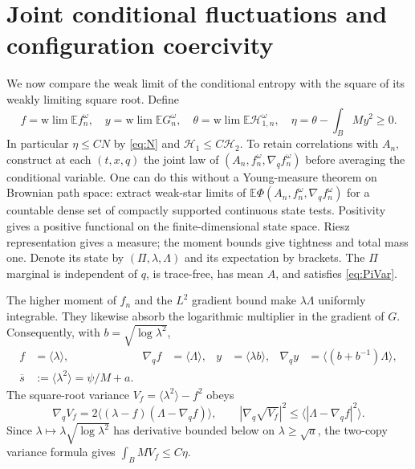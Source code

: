 \documentclass[11pt]{article}
\numberwithin{equation}{section}
\newcommand{\E}{\mathbb E}
\newcommand{\grad}{\nabla}
\newcommand{\Hone}{\mathcal H_1}
\newcommand{\Htwo}{\mathcal H_2}
\newcommand{\pair}[1]{\langle #1\rangle}
\begin{document}
\section{Joint conditional fluctuations and configuration coercivity}\label{sec:law}
We now compare the weak limit of the conditional entropy with the square of
its weakly limiting square root. Define
\begin{equation}\label{eq:defect}
 f=\mathrm{w}\!\lim\E f_n^\omega,\quad
 y=\mathrm{w}\!\lim\E G_n^\omega,\quad
 \theta=\mathrm{w}\!\lim\E\mathcal H_{1,n}^\omega,\quad
 \eta=\theta-\int_BMy^2\geq0.
\end{equation}
In particular $\eta\leq CN$ by \eqref{eq:N} and $\Hone\leq C\Htwo$.
To retain correlations with $A_n$, construct at each $(t,x,q)$ the joint law
of $(A_n,f_n^\omega,\grad_qf_n^\omega)$ before averaging the conditional
variable. One can do this without a Young-measure theorem on Brownian path
space: extract weak-star limits of
$\E\Phi(A_n,f_n^\omega,\grad_qf_n^\omega)$ for a countable dense set of
compactly supported continuous state tests. Positivity gives a positive
functional on the finite-dimensional state space. Riesz representation gives
a measure; the moment bounds give tightness and total mass one. Denote its
state by $(\Pi,\lambda,\Lambda)$ and its expectation by brackets.
The $\Pi$ marginal is independent of $q$, is trace-free, has mean $A$, and
satisfies \eqref{eq:PiVar}.

The higher moment of $f_n$ and the $L^2$ gradient bound make $\lambda\Lambda$
uniformly integrable. They likewise absorb the logarithmic multiplier in
the gradient of $G$. Consequently, with $b=\sqrt{\log\lambda^2}$,
\begin{align}
 f&=\pair\lambda,&\grad_qf&=\pair\Lambda,&
 y&=\pair{\lambda b},&\grad_qy&=\pair{(b+b^{-1})\Lambda},\label{eq:lawmoments}\\
 \overline s&:=\pair{\lambda^2}=\psi/M+a.
 \nonumber
\end{align}
The square-root variance $V_f=\pair{\lambda^2}-f^2$ obeys
\begin{equation}\label{eq:variancegrad}
 \grad_qV_f=2\pair{(\lambda-f)(\Lambda-\grad_qf)},\qquad
 |\grad_q\sqrt{V_f}|^2\leq\pair{|\Lambda-\grad_qf|^2}.
\end{equation}
Since $\lambda\mapsto\lambda\sqrt{\log\lambda^2}$ has derivative bounded
below on $\lambda\geq\sqrt a$, the two-copy variance formula gives
$\int_BMV_f\leq C\eta$.
\end{document}
